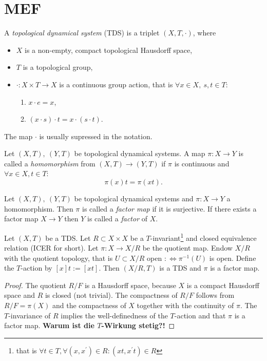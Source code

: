 \section{MEF}
\begin{definition}
  A \emph{topological dynamical system} (TDS) is a triplet $(X,T,\cdot)$, where
  \begin{itemize}
    \item $X$ is a non-empty, compact topological Hausdorff space,
    \item $T$ is a topological group,
    \item $\cdot : X \times T \to X$ is a continuous group action, that is $\forall x \in X, \ s,t \in T$: 
    \begin{enumerate}
      \item $ x\cdot e = x$,
      \item $(x\cdot s)\cdot t = x \cdot (s \cdot t)$.
    \end{enumerate}
  \end{itemize}
\end{definition}
\begin{remark}
  The map $\cdot$ is usually supressed in the notation.
\end{remark}

\begin{definition}
  Let $(X,T), \ (Y,T)$ be topological dynamical systems.
  A map $\pi : X \to Y$ is called a \emph{homomorphism} from $(X,T) \to (Y,T)$ if $\pi$ is continuous and $\forall x \in X, t \in T$:
  \begin{equation*}
     \pi (x)   t = \pi ( x t).
  \end{equation*}
\end{definition}
\begin{definition}
   Let $(X,T), \ (Y,T)$ be topological dynamical systems and $\pi: X \to Y$ a homomorphism.
   Then $\pi$ is called a \emph{factor map} if it is surjective.
   If there exists a factor map $X \to Y$ then $Y$ is called a \emph{factor} of $X$.
\end{definition}

\begin{proposition}
  Let $(X,T)$ be a TDS. Let $R \subset X \times X$ be a $T$-invariant\footnote{that is $\forall t \in T, \forall (x,x^\prime ) \in R : (xt ,x^\prime t) \in R$} and closed equivalence relation (ICER for short).
  Let $\pi : X \to X/R$ be the quotient map.
  Endow $X/R$ with the quotient topology, that is $U \subset X/R$ open $: \Leftrightarrow \pi^{-1}(U)$ is open.
  Define the $T$-action by $[x] t := [x t]$.
  Then $(X/R, T)$ is a TDS and $\pi$ is a factor map.
\end{proposition}
\begin{proof}
  The quotient $R/F$ is a Hausdorff space, because $X$ is a compact Hausdorff space and $R$ is closed (not trivial).
 The compactness of $R/F$ follows from $R/F = \pi (X)$ and the compactness of $X$ together with the continuity of $\pi$. The $T$-invariance of $R$ implies the well-definedness of the $T$-action and that $\pi$ is a factor map.
  \textbf{Warum ist die $T$-Wirkung stetig?!}
\end{proof}

